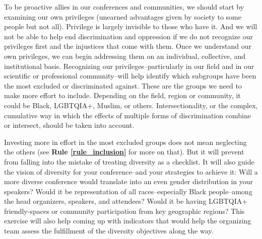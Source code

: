 \documentclass[10pt,letterpaper]{article}
\begin{document}
To be proactive allies in our conferences and communities, we should start by examining our own privileges (unearned advantages given by society to some people but not all).
Privilege is largely invisible to those who have it. And we will not be able to help end discrimination and oppression if we do not recognize our privileges first and the injustices that come with them.
Once we understand our own privileges, we can begin addressing them on an individual, collective, and institutional basis.
Recognizing our privileges--particularly in our field and in our scientific or professional community--will help identify which subgroups have been the most excluded or discriminated against. 
These are the groups we need to make more effort to include. 
Depending on the field, region or community, it could be Black, LGBTQIA+, Muslim, or others. 
Intersectionality, or the complex, cumulative way in which the effects of multiple forms of discrimination combine or intersect, should be taken into account. 

Investing more in effort in the most excluded groups does not mean neglecting the others (see \textbf{Rule \ref{rule_inclusion}} for more on that). 
But it will prevent from falling into the mistake of treating diversity as a checklist.
It will also guide the vision of diversity for your conference--and your strategies to achieve it:
Will a more diverse conference would translate into an even gender distribution in your speakers? 
Would it be representation of all races--especially Black people--among the head organizers, speakers, and attendees? 
Would it be having LGBTQIA+ friendly-spaces or community participation from key geographic regions?
This exercise will also help coming up with indicators that would help the organizing team assess the fulfillment of the diversity objectives along the way. 

\end{document}
